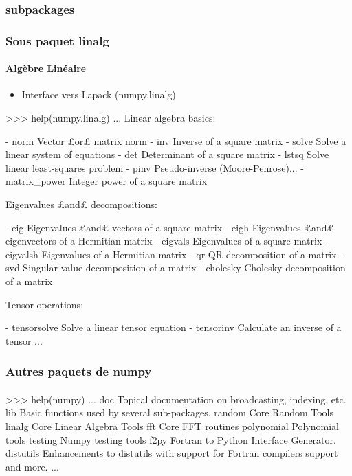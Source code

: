 \subsubsection{subpackages}
\begin{frame}[fragile]
\frametitle{Sous paquet linalg}
\framesubtitle{Algèbre Linéaire}
\begin{itemize}
 \item Interface vers Lapack (numpy.linalg)
\end{itemize}
\begin{pythonConsole}
>>> help(numpy.linalg)
...
    Linear algebra basics:
    
    - norm            Vector £or£ matrix norm
    - inv             Inverse of a square matrix
    - solve           Solve a linear system of equations
    - det             Determinant of a square matrix
    - lstsq           Solve linear least-squares problem
    - pinv            Pseudo-inverse (Moore-Penrose)...
    - matrix_power    Integer power of a square matrix
    
    Eigenvalues £and£ decompositions:
    
    - eig             Eigenvalues £and£ vectors of a square matrix
    - eigh            Eigenvalues £and£ eigenvectors of a Hermitian matrix
    - eigvals         Eigenvalues of a square matrix
    - eigvalsh        Eigenvalues of a Hermitian matrix
    - qr              QR decomposition of a matrix
    - svd             Singular value decomposition of a matrix
    - cholesky        Cholesky decomposition of a matrix
    
    Tensor operations:
    
    - tensorsolve     Solve a linear tensor equation
    - tensorinv       Calculate an inverse of a tensor
...
\end{pythonConsole}
\end{frame}
\begin{frame}[fragile]
\frametitle{Autres paquets de numpy}
\framesubtitle{}
\begin{pythonConsole}
>>> help(numpy)
...
    doc
        Topical documentation on broadcasting, indexing, etc.
    lib
        Basic functions used by several sub-packages.
    random
        Core Random Tools
    linalg
        Core Linear Algebra Tools
    fft
        Core FFT routines
    polynomial
        Polynomial tools
    testing
        Numpy testing tools
    f2py
        Fortran to Python Interface Generator.
    distutils
        Enhancements to distutils with support for
        Fortran compilers support and more.
...
\end{pythonConsole}
\end{frame}
